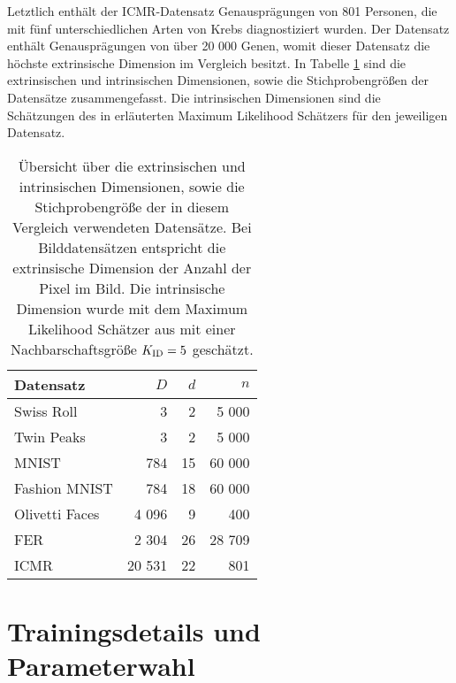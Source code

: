 
Letztlich enthält der ICMR-Datensatz Genausprägungen von 801 Personen, die mit fünf
unterschiedlichen Arten von Krebs diagnostiziert wurden. Der Datensatz enthält Genausprägungen von
über 20 000 Genen, womit dieser Datensatz die höchste extrinsische Dimension im Vergleich besitzt.
In Tabelle \ref{tab:uebersicht-datensaetze} sind die extrinsischen und intrinsischen Dimensionen,
sowie die Stichprobengrößen der Datensätze zusammengefasst. Die intrinsischen Dimensionen sind die
Schätzungen des in 
erläuterten Maximum Likelihood Schätzers für den jeweiligen Datensatz.

\begin{table}[]
	\centering
	\begin{tabular}{@{}lrrr@{}}
		\toprule
		Datensatz      & $D$    & $d$ & $n$    \\ \midrule
		Swiss Roll     & 3      & 2   & 5 000  \\
		Twin Peaks     & 3      & 2   & 5 000  \\
		MNIST          & 784    & 15  & 60 000 \\
		Fashion MNIST  & 784    & 18  & 60 000 \\
		Olivetti Faces & 4 096  & 9   & 400    \\
		FER            & 2 304  & 26  & 28 709 \\
		ICMR           & 20 531 & 22  & 801    \\
		\bottomrule
	\end{tabular}
	\caption[Übersicht über die extrinsischen und intrinsischen Dimensionen, sowie die Stichprobengrößen der in diesem Vergleich verwendeten Datensätze]{Übersicht über die extrinsischen und intrinsischen Dimensionen, sowie die Stichprobengröße der in diesem Vergleich verwendeten Datensätze. Bei Bilddatensätzen entspricht die extrinsische Dimension der Anzahl der Pixel im Bild. Die intrinsische Dimension wurde mit dem Maximum Likelihood Schätzer aus  mit einer Nachbarschaftsgröße $K_{\text{ID}} = 5$ geschätzt.}
	\label{tab:uebersicht-datensaetze}
\end{table}

\section{Trainingsdetails und Parameterwahl}
\label{ch:Vergleich:sec:ParameterwahlTrainingsdetails}

